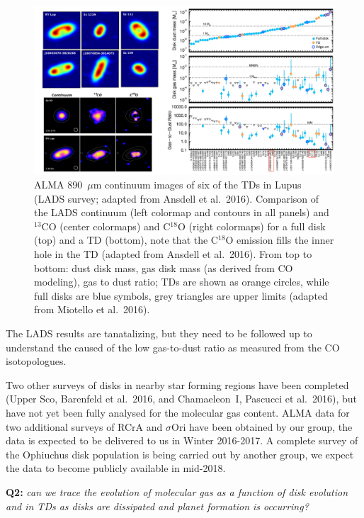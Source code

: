\documentclass[10pt,fleqn,twoside]{article}
\begin{document}
\begin{figure}
\centerline{\includegraphics[scale=0.45]{Figure_Lupus_TDs.pdf}}
\caption{ ALMA 890~$\mu$m continuum images
  of six of the TDs in Lupus (LADS survey; adapted from Ansdell et
  al.~2016).  Comparison of the LADS
  continuum (left colormap and contours in all panels) and $^{13}$CO (center
  colormaps) and C$^{18}$O (right colormaps) for a full disk (top) and a TD
  (bottom), note that the C$^{18}$O emission fills the inner hole in the TD
  (adapted from Ansdell et al.~2016).  From top
  to bottom: dust disk mass, gas disk mass (as derived from CO modeling),
  gas to dust ratio; TDs are shown as orange circles, while full disks are
  blue symbols, grey triangles are upper limits (adapted from Miotello et
  al.~2016).}
\label{f_LADS}
\end{figure}

The LADS results are tanatalizing, but they need to be followed up to understand the caused of the low gas-to-dust ratio as measured from the CO isotopologues.

Two other surveys of disks in nearby star forming regions have been completed (Upper Sco, Barenfeld et al.~2016, and Chamaeleon~I, Pascucci et al.~2016), but have not yet been fully analysed for the molecular gas content. ALMA data for two additional surveys of RCrA and $\sigma$Ori have been obtained by our group, the data is expected to be delivered to us in Winter 2016-2017. A complete survey of the Ophiuchus disk population is being carried out by another group, we expect the data to become publicly available in mid-2018.

\smallskip
{\bf Q2:} {\it can we trace the evolution of molecular gas as a function of disk evolution and in TDs as disks are dissipated and planet formation is occurring?}
\end{document}
